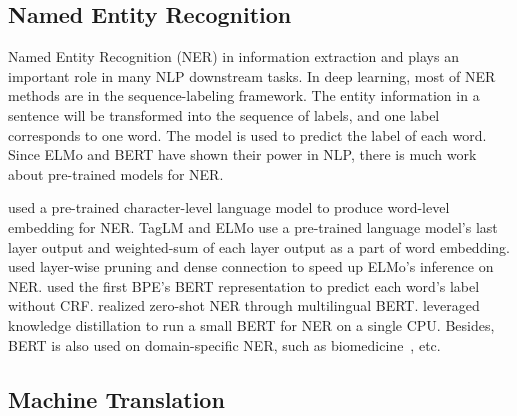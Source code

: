 \documentclass[fleqn]{SCYE-arxiv}
\begin{document}
\begin{multicols}{2}
%
%


\subsection{Named Entity Recognition}

Named Entity Recognition (NER)  in information extraction and plays an important role in many NLP downstream tasks. In deep learning, most of NER methods are in the sequence-labeling framework. The entity information in a sentence will be transformed into the sequence of labels, and one label corresponds to one word. The model is used to predict the label of each word. Since ELMo and BERT have shown their power in NLP, there is much work about pre-trained models for NER.

\citet{akbik2018contextual} used a pre-trained character-level language model to produce word-level embedding for NER.
TagLM \citep{DBLP:conf/acl/PetersABP17} and ELMo \citep{peters2018elmo} use a pre-trained language model's last layer output and weighted-sum of each layer output as a part of word embedding.
\citet{DBLP:conf/emnlp/LiuRSG0018} used layer-wise pruning and dense connection to speed up ELMo's inference on NER.
\citet{devlin2019bert} used the first BPE's BERT representation to predict each word's label without CRF. \citet{DBLP:journals/corr/abs-1906-01502} realized zero-shot NER through multilingual BERT. \citet{tsai-etal-2019-small} leveraged knowledge distillation to run a small BERT for NER on a single CPU. Besides, BERT is also used on domain-specific NER, such as biomedicine~\cite{hakala-pyysalo-2019-biomedical,lee2019biobert}, etc.


\subsection{Machine Translation}


\end{multicols}
\end{document}
